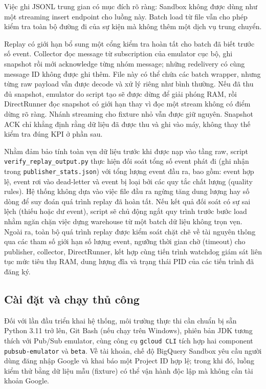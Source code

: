 Việc ghi JSONL trung gian có mục đích rõ ràng: Sandbox không được dùng như một streaming insert endpoint cho luồng này. Batch load từ file vẫn cho phép kiểm tra toàn bộ đường đi của sự kiện mà không thêm một dịch vụ trung chuyển. \medskip

Replay có giới hạn bổ sung một cổng kiểm tra hoàn tất cho batch đã biết trước số event. Collector đọc message từ subscription của emulator cục bộ, ghi snapshot rồi mới acknowledge từng nhóm message; những redelivery có cùng message ID không được ghi thêm. File này có thể chứa các batch wrapper, nhưng từng raw payload vẫn được decode và xử lý riêng như bình thường. Nếu đã thu đủ snapshot, emulator do script tạo sẽ được dừng để giải phóng RAM, rồi DirectRunner đọc snapshot có giới hạn thay vì đọc một stream không có điểm dừng rõ ràng. Nhánh streaming cho fixture nhỏ vẫn được giữ nguyên. Snapshot ACK chỉ khẳng định rằng dữ liệu đã được thu và ghi vào máy, không thay thế kiểm tra đúng KPI ở phần sau.

Nhằm đảm bảo tính toàn vẹn dữ liệu trước khi được nạp vào tầng raw, script \texttt{verify\_replay\_output.py} thực hiện đối soát tổng số event phát đi (ghi nhận trong \texttt{publisher\_stats.json}) với tổng lượng event đầu ra, bao gồm: event hợp lệ, event rơi vào dead-letter và event bị loại bởi các quy tắc chất lượng (quality rules). Hệ thống không dựa vào việc file đầu ra ngừng tăng dung lượng hay số dòng để suy đoán quá trình replay đã hoàn tất. Nếu kết quả đối soát có sự sai lệch (thiếu hoặc dư event), script sẽ chủ động ngắt quy trình trước bước load nhằm ngăn chặn việc dựng warehouse từ một batch dữ liệu không trọn vẹn. Ngoài ra, toàn bộ quá trình replay được kiểm soát chặt chẽ về tài nguyên thông qua các tham số giới hạn số lượng event, ngưỡng thời gian chờ (timeout) cho publisher, collector, DirectRunner, kết hợp cùng tiến trình watchdog giám sát liên tục mức tiêu thụ RAM, dung lượng đĩa và trạng thái PID của các tiến trình đã đăng ký.

\subsection{Cài đặt và chạy thủ công}

Đối với lần đầu triển khai hệ thống, môi trường thực thi cần chuẩn bị sẵn Python 3.11 trở lên, Git Bash (nếu chạy trên Windows), phiên bản JDK tương thích với Pub/Sub emulator, cùng công cụ \texttt{gcloud CLI} tích hợp hai component \texttt{pubsub-emulator} và \texttt{beta}. Về tài khoản, chế độ BigQuery Sandbox yêu cầu người dùng đăng nhập Google và khai báo một Project ID hợp lệ; trong khi đó, luồng kiểm thử bằng dữ liệu mẫu (fixture) có thể vận hành độc lập mà không cần tài khoản Google. \medskip

